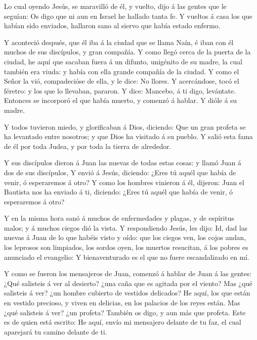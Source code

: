  Lo cual oyendo Jesús, se maravilló de él, y vuelto, dijo á
las gentes que le seguían: Os digo que ni aun en Israel he hallado tanta
fe.  Y vueltos á casa los que habían sido enviados,
hallaron sano al siervo que había estado enfermo.

 Y aconteció después, que él iba á la ciudad que se llama
Naín, é iban con él muchos de sus discípulos, y gran compañía.
 Y como llegó cerca de la puerta de la ciudad, he aquí que
sacaban fuera á un difunto, unigénito de su madre, la cual también era
viuda: y había con ella grande compañía de la ciudad.  Y
como el Señor la vió, compadecióse de ella, y le dice: No llores.
 Y acercándose, tocó el féretro: y los que lo llevaban,
pararon. Y dice: Mancebo, á ti digo, levántate.  Entonces
se incorporó el que había muerto, y comenzó á hablar. Y dióle á su
madre.

 Y todos tuvieron miedo, y glorificaban á Dios, diciendo:
Que un gran profeta se ha levantado entre nosotros; y que Dios ha
visitado á su pueblo.  Y salió esta fama de él por toda
Judea, y por toda la tierra de alrededor.

 Y sus discípulos dieron á Juan las nuevas de todas estas
cosas: y llamó Juan á dos de sus discípulos,  Y envió á
Jesús, diciendo: ¿Eres tú aquél que había de venir, ó esperaremos á
otro?  Y como los hombres vinieron á él, dijeron: Juan el
Bautista nos ha enviado á ti, diciendo: ¿Eres tú aquél que había de
venir, ó esperaremos á otro?

 Y en la misma hora sanó á muchos de enfermedades y plagas,
y de espíritus malos; y á muchos ciegos dió la vista.  Y
respondiendo Jesús, les dijo: Id, dad las nuevas á Juan de lo que habéis
visto y oído: que los ciegos ven, los cojos andan, los leprosos son
limpiados, los sordos oyen, los muertos resucitan, á los pobres es
anunciado el evangelio:  Y bienaventurado es el que no
fuere escandalizado en mí.

 Y como se fueron los mensajeros de Juan, comenzó á hablar
de Juan á las gentes: ¿Qué salisteis á ver al desierto? ¿una caña que es
agitada por el viento?  Mas ¿qué salisteis á ver? ¿un
hombre cubierto de vestidos delicados? He aquí, los que están en vestido
precioso, y viven en delicias, en los palacios de los reyes están.
 Mas ¿qué salisteis á ver? ¿un profeta? También os digo, y
aun más que profeta.  Este es de quien está escrito: He
aquí, envío mi mensajero delante de tu faz, el cual aparejará tu camino
delante de ti.

